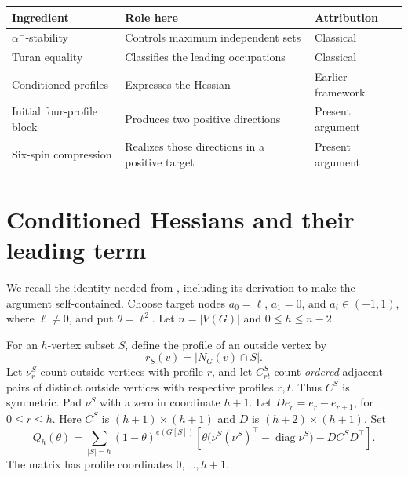 \documentclass[11pt]{article}
\theoremstyle{remark}\newtheorem{remark}[theorem]{Remark}
\DeclareMathOperator{\diag}{diag}
\begin{document}
\begin{center}
\begin{tabular}{@{}>{\raggedright\arraybackslash}p{}>{\raggedright\arraybackslash}p{}>{\raggedright\arraybackslash}p{}@{}}
\toprule
Ingredient & Role here & Attribution\\
\midrule
$\alpha^-$-stability & Controls maximum independent sets &
Classical \cite{LM}\\
Turan equality & Classifies the leading occupations &
Classical \cite{Turan}\\
Conditioned profiles & Expresses the Hessian &
Earlier framework \cite{Eriksson}\\
Initial four-profile block & Produces two positive directions &
Present argument\\
Six-spin compression & Realizes those directions in a positive target &
Present argument\\
\bottomrule
\end{tabular}
\end{center}

\section{Conditioned Hessians and their leading term}

We recall the identity needed from \cite{Eriksson}, including its
derivation to make the argument self-contained. Choose target nodes
$a_0=\ell$, $a_1=0$, and $a_i\in(-1,1)$, where $\ell\ne0$, and put
$\theta=\ell^2$. Let $n=|V(G)|$ and $0\le h\le n-2$.

For an $h$-vertex subset $S$, define the profile of an outside vertex by
\[
 r_S(v)=|N_G(v)\cap S|.
\]
Let $\nu^S_r$ count outside vertices with profile $r$, and let
$C^S_{rt}$ count \emph{ordered} adjacent pairs of distinct outside
vertices with respective profiles $r,t$. Thus $C^S$ is symmetric.
Pad $\nu^S$ with a zero in coordinate $h+1$. Let
$D e_r=e_r-e_{r+1}$, for $0\le r\le h$. Here $C^S$ is
$(h+1)\times(h+1)$ and $D$ is $(h+2)\times(h+1)$. Set
\begin{equation}
 Q_h(\theta)=\sum_{|S|=h}(1-\theta)^{e(G[S])}
 \left[
 \theta\bigl(\nu^S(\nu^S)^\top-\diag\nu^S\bigr)
 -D C^S D^\top
 \right].                                      \label{eq:Q}
\end{equation}
The matrix has profile coordinates $0,\ldots,h+1$.
\end{document}
